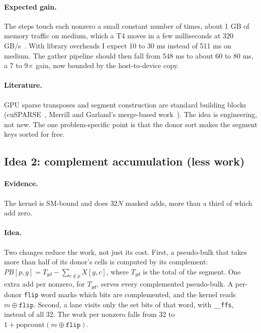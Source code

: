 \documentclass[sigconf,nonacm]{acmart}
\newcommand{\code}[1]{\texttt{#1}}
\begin{document}
\paragraph{Expected gain.} The steps touch each nonzero a small constant number of times, about 1 GB of
memory traffic on medium, which a T4 moves in a few milliseconds at 320 GB/s~\cite{t4datasheet}. With
library overheads I expect 10 to 30 ms instead of 511 ms on medium. The gather pipeline should then
fall from 548 ms to about 60 to 80 ms, a 7 to 9$\times$ gain, now bounded by the host-to-device copy.

\paragraph{Literature.} GPU sparse transposes and segment construction are standard building blocks
(cuSPARSE~\cite{cusparse}, Merrill and Garland's merge-based work~\cite{merrill2016}). The idea is
engineering, not new. The one problem-specific point is that the donor sort makes the segment keys
sorted for free.

\subsection{Idea 2: complement accumulation (less work)}

\paragraph{Evidence.} The kernel is SM-bound and does $32N$ masked adds, more than a third of which add zero.

\paragraph{Idea.} Two changes reduce the work, not just its cost. First, a pseudo-bulk that takes more
than half of its donor's cells is computed by its complement: $PB[p,g] = T_{gd} - \sum_{c \notin p} X[g,c]$,
where $T_{gd}$ is the total of the segment. One extra add per nonzero, for $T_{gd}$, serves every
complemented pseudo-bulk. A per-donor \code{flip} word marks which bits are complemented, and the
kernel reads $m \oplus \code{flip}$. Second, a lane visits only the set bits of that word, with
\code{\_\_ffs}, instead of all 32. The work per nonzero falls from 32 to
$1 + \mathrm{popcount}(m \oplus \code{flip})$.
\end{document}
